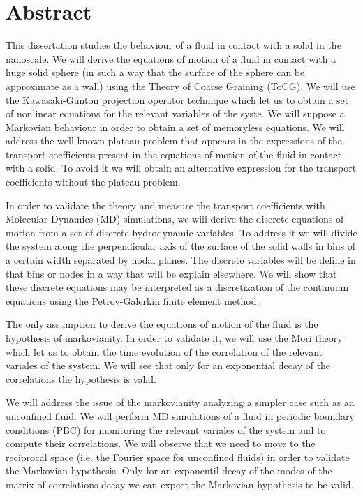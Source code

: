 \documentclass[b5paper,openright,10pt]{book}
\begin{document}
\chapter*{Abstract} %
\pagestyle{noHeader}  %
This dissertation studies the behaviour of a fluid in contact with a solid in the nanoscale. We will derive the equations of motion of a fluid in contact with a huge solid sphere (in such a way that the surface of the sphere can be approximate as a wall) using the Theory of Coarse Graining (ToCG).
We will use the Kawasaki-Gunton projection operator technique which let us to obtain a set of nonlinear equations for the relevant variables of the syste. We will suppose a Markovian behaviour in order to obtain a set of memoryless equations.
We will address the well known plateau problem  that appears in the expressions of the transport coefficients present in the equations of motion of the fluid in contact with a solid. To avoid it we will obtain an alternative expression for the transport coefficients without the plateau problem. 

In order to validate the theory and measure the transport coefficients with Molecular Dynamics (MD) simulations, we will derive the discrete equations of motion from a set of discrete hydrodynamic variables. To address it we will divide the system along the perpendicular axis of the surface of the solid walls in bins of a certain width separated by nodal planes. The discrete variables will be define in that bins or nodes in a way that will be explain elsewhere.
We will show that these discrete equations may be interpreted as a discretization of the continuum equations using the Petrov-Galerkin finite element method.  

The only assumption to derive the equations of motion of the fluid is the hypothesis of markovianity. In order to validate it, we will use the Mori theory which let us to obtain the time evolution of the correlation of the relevant variales of the system. 
We will see that only for an exponential decay of the correlations the hypothesis is valid. 

We will address the issue of the markovianity analyzing a simpler case such as an unconfined fluid. We will perform MD simulations of a fluid in periodic boundary conditions (PBC) for monitoring the relevant variales of the system and to compute their correlations. 
We will observe that we need to move to the reciprocal space (i.e. the Fourier space for unconfined fluids) in order to validate the Markovian hypothesis. Only for an exponentil decay of the modes of the matrix of correlations decay we can expect the Markovian hypothesis to be valid. 
\end{document}
